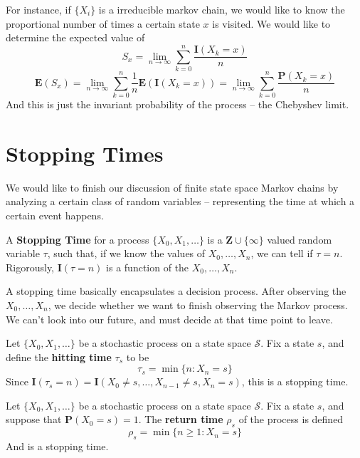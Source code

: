 For instance, if $\{X_i\}$ is a irreducible markov chain, we would like to know the proportional number of times a certain state $x$ is visited. We would like to determine the expected value of
%
\[ S_x = \lim_{n \to \infty} \sum_{k = 0}^n \frac{\mathbf{I}(X_k = x)}{n}  \]
%
\[ \mathbf{E}(S_x) = \lim_{n \to \infty} \sum_{k = 0}^n \frac{1}{n} \mathbf{E}(\mathbf{I}(X_k = x)) = \lim_{n \to \infty} \sum_{k = 0}^n \frac{\mathbf{P}(X_k = x)}{n} \]
%
And this is just the invariant probability of the process -- the Chebyshev limit.

\section{Stopping Times}

We would like to finish our discussion of finite state space Markov chains by analyzing a certain class of random variables -- representing the time at which a certain event happens.

\begin{definition}
    A {\bf Stopping Time} for a process $\{ X_0, X_1, \dots \}$ is a $\mathbf{Z} \cup \{ \infty \}$ valued random variable $\tau$, such that, if we know the values of $X_0, \dots, X_n$, we can tell if $\tau = n$. Rigorously, $\mathbf{I}(\tau = n)$ is a function of the $X_0, \dots, X_n$.
\end{definition}

A stopping time basically encapsulates a decision process. After observing the $X_0, \dots, X_n$, we decide whether we want to finish observing the Markov process. We can't look into our future, and must decide at that time point to leave.

\begin{example}
    Let $\{ X_0, X_1, \dots \}$ be a stochastic process on a state space $\mathcal{S}$. Fix a state $s$, and define the {\bf hitting time} $\tau_s$ to be
    \[ \tau_s = \min \{ n : X_n = s \} \]
    Since $\mathbf{I}(\tau_s = n) = \mathbf{I}(X_0 \neq s, \dots, X_{n-1} \neq s, X_n = s)$, this is a stopping time.
\end{example}

\begin{example}
    Let $\{ X_0, X_1, \dots \}$ be a stochastic process on a state space $\mathcal{S}$. Fix a state $s$, and suppose that $\mathbf{P}(X_0 = s) = 1$. The {\bf return time} $\rho_s$ of the process is defined
    \[ \rho_s = \min \{ n \geq 1 : X_n = s \} \]
    And is a stopping time.
\end{example}

